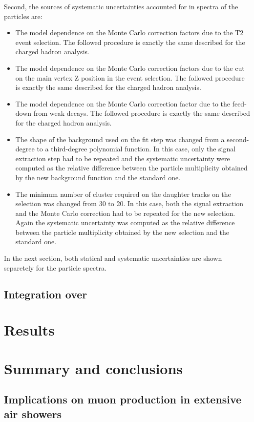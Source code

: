 Second, the sources of systematic uncertainties accounted for in
spectra of the \vzero particles are:
\begin{itemize}
\item The model dependence on the Monte Carlo correction factors due to
  the T2 event selection. The followed procedure is exactly the same described
  for the charged hadron analysis.
  
\item The model dependence on the Monte Carlo correction factors due to
  the cut on the main vertex Z position in the event selection.
  The followed procedure is exactly the same described
  for the charged hadron analysis.
  
\item The model dependence on the Monte Carlo correction factor due to
  the feed-down from weak decays. The followed procedure is exactly the same described
  for the charged hadron analysis.
  
\item The shape of the background used on the \minv fit step
  was changed from a second-degree to a third-degree polynomial
  function. In this case, only the signal extraction step had to be
  repeated and the systematic uncertainty were computed as the relative
  difference between the particle multiplicity obtained by the new
  background function and the standard one.

\item The minimum number of cluster required on the daughter tracks on the
  \vzero selection was changed from 30 to 20. In this case, both the signal
  extraction and the Monte Carlo correction had to be repeated for the new \vzero
  selection. Again the systematic uncertainty was computed as the relative
  difference between the particle multiplicity obtained by the new
  selection and the standard one.

\end{itemize}


In the next section, both statical and systematic uncertainties
are shown separetely for the particle spectra.

\subsection{Integration over \pT}
\label{sec:hadron:spec:int}


\section{Results}


\section{Summary and conclusions}


\subsection{Implications on muon production in extensive air showers}


